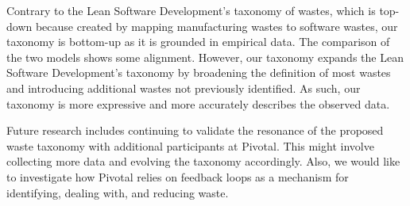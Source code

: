 Contrary to the Lean Software Development's taxonomy of wastes, which is top-down because created by mapping manufacturing wastes to software wastes, our taxonomy is bottom-up as it is grounded in empirical data. The comparison of the two models shows some alignment. However, our taxonomy expands the Lean Software Development's taxonomy by broadening the definition of most wastes and introducing additional wastes not previously identified. As such, our taxonomy is more expressive and more accurately describes the observed data.

Future research includes continuing to validate the resonance of the proposed waste taxonomy with additional participants at Pivotal. This might involve collecting more data and evolving the taxonomy accordingly. Also, we would like to investigate how Pivotal relies on feedback loops as a mechanism for identifying, dealing with, and reducing waste. 







